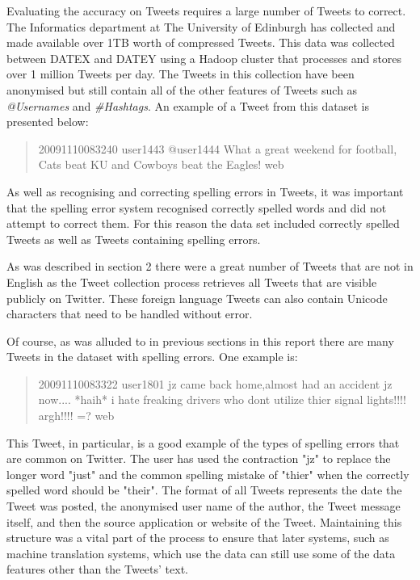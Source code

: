 Evaluating the accuracy on Tweets requires a large number of Tweets to correct. The Informatics department at The University of Edinburgh has collected and made available over 1TB worth of compressed Tweets\cite{}. This data was collected between DATEX and DATEY using a Hadoop cluster \cite{} that processes and stores over 1 million Tweets per day. The Tweets in this collection have been anonymised but still contain all of the other features of Tweets such as \emph{@Usernames} and \emph{#Hashtags}. An example of a Tweet from this dataset is presented below:

\begin{quote}
20091110083240 user1443 @user1444 What a great weekend for football, Cats beat KU and Cowboys beat the Eagles! web
\end{quote}

As well as recognising and correcting spelling errors in Tweets, it was important that the spelling error system recognised correctly spelled words and did not attempt to correct them. For this reason the data set included correctly spelled Tweets as well as Tweets containing spelling errors.

As was described in section 2 there were a great number of Tweets that are not in English as the Tweet collection process retrieves all Tweets that are visible publicly on Twitter. These foreign language Tweets can also contain Unicode characters that need to be handled without error.

Of course, as was alluded to in previous sections in this report there are many Tweets in the dataset with spelling errors. One example is:

\begin{quote}
20091110083322 user1801 jz came back home,almost had an accident jz now.... *haih* i hate freaking drivers who dont utilize thier signal lights!!!! argh!!!! =? web
\end{quote}

This Tweet, in particular, is a good example of the types of spelling errors that are common on Twitter. The user has used the contraction "jz" to replace the longer word "just" and the common spelling mistake of "thier" when the correctly spelled word should be "their". The format of all Tweets represents the date the Tweet was posted, the anonymised user name of the author, the Tweet message itself, and then the source application or website of the Tweet. Maintaining this structure was a vital part of the process to ensure that later systems, such as machine translation systems, which use the data can still use some of the data features other than the Tweets' text.

